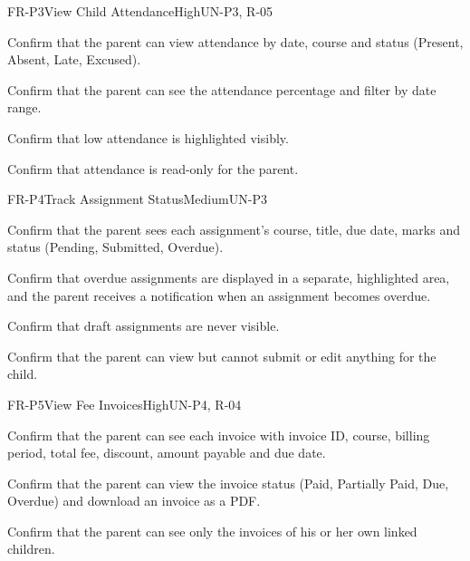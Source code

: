 \begin{userstory}{FR-P3}{View Child Attendance}{High}{UN-P3, R-05}
  \begin{confirmation}
    \item Confirm that the parent can view attendance by date, course and status (Present, Absent, Late, Excused).
    \item Confirm that the parent can see the attendance percentage and filter by date range.
    \item Confirm that low attendance is highlighted visibly.
    \item Confirm that attendance is read-only for the parent.
  \end{confirmation}
\end{userstory}

\begin{userstory}{FR-P4}{Track Assignment Status}{Medium}{UN-P3}
  \begin{confirmation}
    \item Confirm that the parent sees each assignment's course, title, due date, marks and status (Pending, Submitted, Overdue).
    \item Confirm that overdue assignments are displayed in a separate, highlighted area, and the parent receives a notification when an assignment becomes overdue.
    \item Confirm that draft assignments are never visible.
    \item Confirm that the parent can view but cannot submit or edit anything for the child.
  \end{confirmation}
\end{userstory}

\begin{userstory}{FR-P5}{View Fee Invoices}{High}{UN-P4, R-04}
  \begin{confirmation}
    \item Confirm that the parent can see each invoice with invoice ID, course, billing period, total fee, discount, amount payable and due date.
    \item Confirm that the parent can view the invoice status (Paid, Partially Paid, Due, Overdue) and download an invoice as a PDF.
    \item Confirm that the parent can see only the invoices of his or her own linked children.
  \end{confirmation}
\end{userstory}

